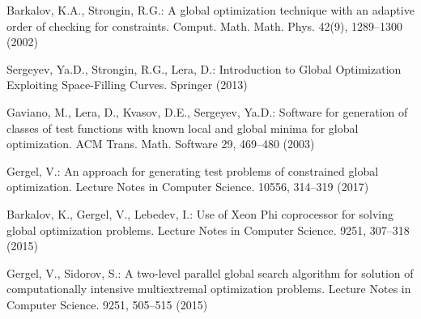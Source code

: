 \documentclass[smallextended]{svjour3}       %
\begin{document}
\begin{thebibliography}{}
Barkalov, K.A., Strongin, R.G.: A global optimization technique with an adaptive order of checking for constraints. Comput. Math. Math. Phys. 42(9), 1289--1300 (2002)

Sergeyev, Ya.D., Strongin, R.G., Lera, D.: Introduction to Global Optimization Exploiting Space-Filling Curves. Springer (2013)

Gaviano, M., Lera, D., Kvasov, D.E., Sergeyev, Ya.D.: Software for generation of classes of test functions with known local and global minima for global optimization. ACM Trans. Math. Software 29, 469--480 (2003)

Gergel, V.: An approach for generating test problems of constrained global optimization. Lecture Notes in Computer Science. 10556, 314--319 (2017)

Barkalov, K., Gergel, V., Lebedev, I.: Use of Xeon Phi coprocessor for solving global optimization problems. Lecture Notes in Computer Science. 9251, 307--318 (2015)

Gergel, V., Sidorov, S.: A two-level parallel global search algorithm for solution of computationally intensive multiextremal optimization problems. Lecture Notes in Computer Science. 9251, 505--515 (2015)


%
\end{thebibliography}
\end{document}

